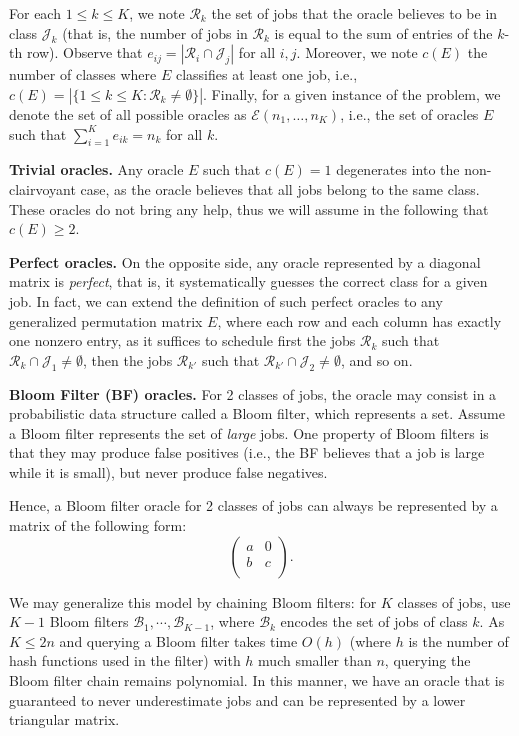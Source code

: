 \documentclass{article}
\begin{document}
For each \(1\le k\le K\), we note \(\mathcal{R}_k\) the set of jobs that the
oracle believes to be in class \(\mathcal{J}_k\) (that is, the number of jobs in
\(\mathcal{R}_k\) is equal to the sum of entries of the \(k\)-th row).  
Observe that \(e_{ij}=|\mathcal{R}_i\cap\mathcal{J}_j|\) for all \(i,j\).  
Moreover, we note \(c(E)\) the number of classes where \(E\) classifies at least
one job, i.e., \(c(E)=|\{1\le k\le K:\mathcal{R}_k\ne\emptyset\}|\).  
Finally, for a given instance of the problem, we denote the set of all possible oracles as \(\mathcal{E}(n_1,\ldots,n_K)\), i.e., the set of oracles \(E\) such that \(\sum_{i=1}^K e_{ik}=n_k\) for all \(k\).

\medskip\noindent\textbf{Trivial oracles.} Any oracle \(E\) such that \(c(E)=1\)
degenerates into the non-clairvoyant case, as the oracle believes that all jobs
belong to the same class.  
These oracles do not bring any help, thus we will assume in the following that
\(c(E)\ge 2\).

\medskip\noindent\textbf{Perfect oracles.} On the opposite side, any oracle
represented by a diagonal matrix is \emph{perfect}, that is, it systematically
guesses the correct class for a given job.  
In fact, we can extend the definition of such perfect oracles to any generalized
permutation matrix \(E\), where each row and each column has exactly one nonzero
entry, as it suffices to schedule first the jobs \(\mathcal{R}_k\) such that
\(\mathcal{R}_k\cap\mathcal{J}_1\ne\emptyset\), then the jobs \(\mathcal{R}_{k'}\) such that \(\mathcal{R}_{k'}\cap\mathcal{J}_2\ne\emptyset\), and so on.

\medskip\noindent\textbf{Bloom Filter (BF) oracles.} For 2 classes of jobs, the
oracle may consist in a probabilistic data structure called a Bloom filter,
which represents a set. Assume a Bloom filter represents the set of \emph{large}
jobs. One property of Bloom filters is that they may produce false positives
(i.e., the BF believes that a job is large while it is small), but never produce
false negatives.

Hence, a Bloom filter oracle for 2 classes of jobs can always be represented by
a matrix of the following form:
\[
    \begin{pmatrix}
        a & 0 \\
        b & c \\
    \end{pmatrix}.
\]

We may generalize this model by chaining Bloom filters: for \(K\) classes of
jobs, use \(K-1\) Bloom filters \(\mathcal{B}_1,\cdots,\mathcal{B}_{K-1}\),
where \(\mathcal{B}_k\) encodes the set of jobs of class \(k\).  As \(K\le 2n\)
and querying a Bloom filter takes time \(O(h)\) (where \(h\) is the number of
hash functions used in the filter) with \(h\) much smaller than \(n\), querying
the Bloom filter chain remains polynomial.  In this manner, we have an oracle
that is guaranteed to never underestimate jobs and can be represented by a lower
triangular matrix.
\end{document}

